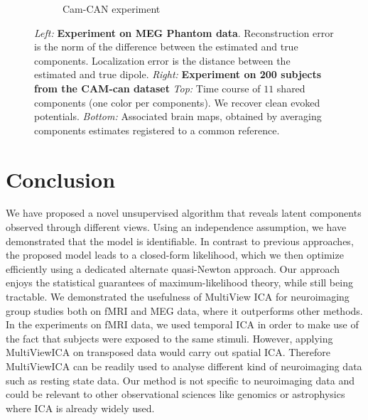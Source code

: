 \documentclass[12pt]{report}
\begin{document}
\begin{figure}
\begin{minipage}{\linewidth}
\begin{minipage}{0.45\linewidth}
\begin{subfigure}[t]{\textwidth}
            \caption{Cam-CAN experiment}
        \end{subfigure}
      \end{minipage}
    \end{minipage}
    \setlength{\belowcaptionskip}{-10pt}
    \caption{\emph{Left:} \textbf{Experiment on MEG Phantom data}. Reconstruction error is the norm of the difference between the estimated and true components. Localization error is the distance between the estimated and true dipole. \emph{Right:} \textbf{Experiment on 200 subjects from the CAM-can dataset} \emph{Top:} Time course of $11$ shared components (one color per components). We recover clean evoked potentials. \emph{Bottom:} Associated brain maps, obtained by averaging components estimates registered to a common reference.}
    \label{fig:meg}
\end{figure}

\vspace{-11pt}
%
%
\section{Conclusion}
\label{sec:disc}
We have proposed a novel unsupervised algorithm that reveals latent components
observed through different views. Using an independence assumption, 
we have demonstrated that the model is identifiable.
%
In contrast to previous approaches, the proposed model leads to a closed-form likelihood, which we then optimize efficiently using a dedicated alternate quasi-Newton approach.
%
Our approach enjoys the statistical guarantees of maximum-likelihood theory, while still being tractable.
%
We demonstrated the usefulness of MultiView ICA for neuroimaging group studies both on fMRI and MEG data, where it outperforms other methods.
%
In the experiments on fMRI data, we used temporal ICA in order to make use of the fact that subjects were exposed to the same stimuli. However, applying MultiViewICA on transposed data would carry out spatial ICA. Therefore MultiViewICA can be readily used to analyse different kind of neuroimaging data such as resting state data. 
%
Our method is not specific to neuroimaging data and could be relevant to other observational sciences like genomics or astrophysics where ICA is already widely used.
%
%
%
%
\end{document}
